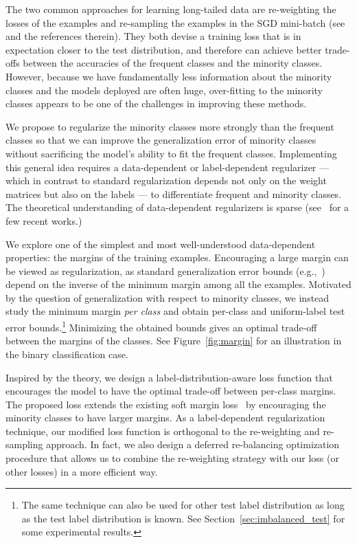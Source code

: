 \documentclass{article}
\begin{document}
The two common approaches for learning long-tailed data are re-weighting the losses of the examples and re-sampling the examples in the SGD mini-batch (see~\citep{buda2018systematic,huang2016learning,cui2019classbalancedloss,he2008learning,he2013imbalanced,chawla2002smote} and the references therein). They both devise a training loss that is in expectation closer to the test distribution, and therefore can achieve better trade-offs between the accuracies of the frequent classes and the minority classes. However, because we have fundamentally less information about the minority classes and the models deployed are often huge, over-fitting to the minority classes appears to be one of the challenges in improving these methods. 

We propose to regularize the minority classes more strongly than the frequent classes so that we can improve the generalization error of minority classes without sacrificing the model's ability to fit the frequent classes. Implementing this general idea requires a data-dependent or label-dependent regularizer  --- which in contrast to standard  regularization depends not only on the weight matrices but also on the labels --- to differentiate frequent and minority classes. The theoretical understanding of data-dependent regularizers is sparse (see~\citep{wei2019data,nagarajan2018deterministic,arora2018stronger} for a few recent works.) 

We explore one of the simplest and most well-understood data-dependent properties: the margins of the training examples. Encouraging a large margin can be viewed as regularization, as standard generalization error bounds (e.g.,~\citep{bartlett2017spectrally,wei2018margin}) depend on the inverse of the minimum margin among all the examples. Motivated by the question of generalization with respect to minority classes, we instead study the minimum margin \textit{per class} and obtain per-class and uniform-label test error bounds.\footnote{The same technique can also be used for other test label distribution as long as the test label distribution is known. See Section~\ref{sec:imbalanced_test} for some experimental results.} Minimizing the obtained bounds gives an optimal trade-off between the margins of the classes. See Figure~\ref{fig:margin} for an illustration in the binary classification case.  

Inspired by the theory, we design a label-distribution-aware loss function that encourages the model to have the optimal trade-off between per-class margins. The proposed loss extends the existing soft margin loss~\citep{wang2018additive} by encouraging the minority classes to have larger margins.  As a label-dependent regularization technique, our modified loss function is orthogonal to the re-weighting and re-sampling approach. In fact, we also design a deferred re-balancing optimization procedure that allows us to combine the re-weighting strategy with our loss (or other losses) in a more efficient way. 
\end{document}
